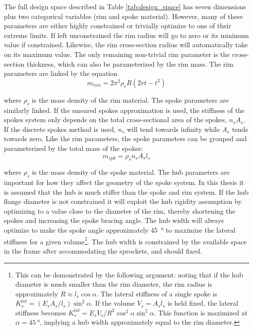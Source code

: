 \documentclass[\rootdir/thesis.tex]{subfiles}
\begin{document}
The full design space described in Table \ref{tab:design_space} has seven dimensions plus two categorical variables (rim and spoke material). However, many of these parameters are either highly constrained or trivially optimize to one of their extreme limits. If left unconstrained the rim radius will go to zero or its minimum value if constrained. Likewise, the rim cross-section radius will automatically take on its maximum value. The only remaining non-trivial rim parameter is the cross-section thickness, which can also be parameterized by the rim mass. The rim parameters are linked by the equation
\begin{equation}
\label{eq:m_rim}
m_{rim} = 2\pi^2 \rho_r R (2rt - t^2)
\end{equation}

where $\rho_r$ is the mass density of the rim material. The spoke parameters are similarly linked. If the smeared spokes approximation is used, the stiffness of the spokes system only depends on the total cross-sectional area of the spokes, $n_sA_s$. If the discrete spokes method is used, $n_s$ will tend towards infinity while $A_s$ tends towards zero. Like the rim parameters, the spoke parameters can be grouped and parameterized by the total mass of the spokes:
\begin{equation}
\label{eq:m_spokes}
m_{spk} = \rho_s n_s A_s l_s
\end{equation}

where $\rho_s$ is the mass density of the spoke material. The hub parameters are important for how they affect the geometry of the spoke system. In this thesis it is assumed that the hub is much stiffer than the spoke and rim system. If the hub flange diameter is not constrained it will exploit the hub rigidity assumption by optimizing to a value close to the diameter of the rim, thereby shortening the spokes and increasing the spoke bracing angle. The hub width will always optimize to make the spoke angle approximately \SI{45}{\degree} to maximize the lateral stiffness for a given volume\footnote{This can be demonstrated by the following argument: noting that if the hub diameter is much smaller than the rim diameter, the rim radius is approximately $R \approx l_s \cos{\alpha}$. The lateral stiffness of a single spoke is $K_s^{lat} = (E_sA_s/l_s)\sin^2{\alpha}$. If the volume $V_s=A_sl_s$ is held fixed, the lateral stiffness becomes $K_s^{lat} = E_sV_s/R^2 \cos^2{\alpha}\sin^2{\alpha}$. This function is maximized at $\alpha=\SI{45}{\degree}$, implying a hub width approximately equal to the rim diameter.}. The hub width is constrained by the available space in the frame after accommodating the sprockets, and should fixed.
\end{document}
